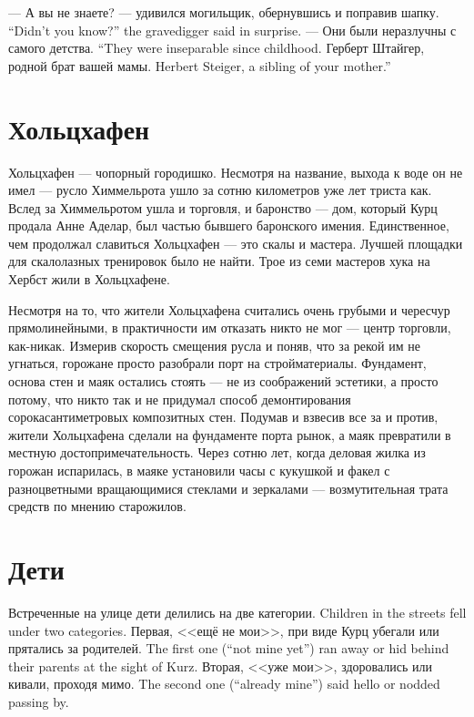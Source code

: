 {--- А вы не знаете? --- удивился могильщик, обернувшись и поправив шапку.}
{``Didn't you know?'' the gravedigger said in surprise.}
{--- Они были неразлучны с самого детства.}
{``They were inseparable since childhood.}
{Герберт Штайгер, родной брат вашей мамы.}
{Herbert Steiger, a sibling of your mother.''}

\section{Хольцхафен}

Хольцхафен --- чопорный городишко.
Несмотря на название, выхода к воде он не имел --- русло Химмельрота ушло за сотню километров уже лет триста как.
Вслед за Химмельротом ушла и торговля, и баронство --- дом, который Курц продала Анне Аделар, был частью бывшего баронского имения.
Единственное, чем продолжал славиться Хольцхафен --- это скалы и мастера.
Лучшей площадки для скалолазных тренировок было не найти.
Трое из семи мастеров хука на Хербст жили в Хольцхафене.

Несмотря на то, что жители Хольцхафена считались очень грубыми и чересчур прямолинейными, в практичности им отказать никто не мог --- центр торговли, как-никак.
Измерив скорость смещения русла и поняв, что за рекой им не угнаться, горожане просто разобрали порт на стройматериалы.
Фундамент, основа стен и маяк остались стоять --- не из соображений эстетики, а просто потому, что никто так и не придумал способ демонтирования сорокасантиметровых композитных стен.
Подумав и взвесив все за и против, жители Хольцхафена сделали на фундаменте порта рынок, а маяк превратили в местную достопримечательность.
Через сотню лет, когда деловая жилка из горожан испарилась, в маяке установили часы с кукушкой и факел с разноцветными вращающимися стеклами и зеркалами --- возмутительная трата средств по мнению старожилов.

\section{Дети}

{Встреченные на улице дети делились на две категории.}
{Children in the streets fell under two categories.}
{Первая, <<ещё не мои>>, при виде Курц убегали или прятались за родителей.}
{The first one (``not mine yet'') ran away or hid behind their parents at the sight of Kurz.}
{Вторая, <<уже мои>>, здоровались или кивали, проходя мимо.}
{The second one (``already mine'') said hello or nodded passing by.}


